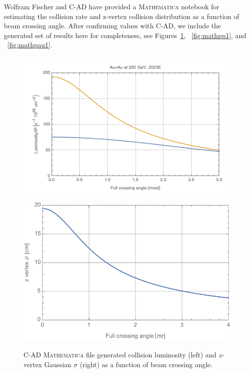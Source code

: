 Wolfram Fischer and C-AD have provided a {\textsc{Mathematica}} notebook for estimating the collision rate and z-vertex collision distribution as a function of beam crossing angle.  After confirming values with C-AD, we include the generated set of results here for completeness, see Figures~\ref{fig:mathauau1}, ~\ref{fig:mathpp1}, and ~\ref{fig:mathpau1}.

\begin{figure}[h!]
    \centering
        \includegraphics[width=0.7\linewidth]{figs/figure_cad1_prelim.png}  
    \includegraphics[width=0.62\linewidth]{figs/auau200-2023-202008131-z.pdf}
    \caption{C-AD {\textsc{Mathematica}} file generated \auau collision luminosity (left) and $z$-vertex Gaussian $\sigma$ (right) as a function of beam crossing angle.}
    \label{fig:mathauau1}
\end{figure}

